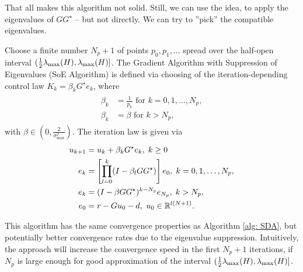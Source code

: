 That all makes this algorithm not solid. Still, we can use the idea, to apply the eigenvalues of $G G^{\star}$ -- but not directly. We can try to ''pick'' the compatible eigenvalues.
\begin{alg}
	Choose a finite number $N_p + 1$ of points $p_0, p_1, \dots$ spread over the half-open interval $(\frac{1}{2}\lambda_{\mathrm{max}}(H), \lambda_{\mathrm{max}}(H)]$. 
	The Gradient Algorithm with Suppression of Eigenvalues (SoE Algorithm) is defined via choosing of the iteration-depending control law  $K_k = \beta_k G^\star e_k$, where 
	\begin{align}
	\begin{split}
	\beta_k &= \frac{1}{p_k} \text{ for } k = 0 , 1, \dots , N_p,\\
	\beta_k &= \beta  \text{ for } k > N_p,
	\end{split}
	\end{align}
	with $\beta \in (0, \frac{2}{\sigma_{\max}^2})$.
	The iteration law is given via
	\begin{align}
	\begin{split}
	u_{k+1} &= u_k + \beta_k G^\star e_k, \; k\geq 0\\
	e _{k} &= \left[\prod_{l = 0}^k (I - \beta_l  GG^\star) \right] e_{0}, \;  k = 0 , 1, \dots , N_p,\\
	e _{k} &=  (I - \beta GG^\star)^{k - N_p} e_{N_p}, \;  k > N_p, \\
	e_0 &= r -  Gu_0 -d, \text{ } u_0 \in {\mathbb{R}}^{l (N+1)}.
	\end{split}
	\end{align}	
\end{alg}

This algorithm has the same convergence properties as Algorithm \ref{alg: SDA}, but potentially better convergence rates due to the eigenvalue suppression. Intuitively, the approach will increase the convergence speed in the first $N_p + 1$ iterations, if $N_p$ is large enough for good approximation of the interval $(\frac{1}{2} \lambda_{\mathrm{max}}(H), \lambda_{\mathrm{max}}(H)]$.

